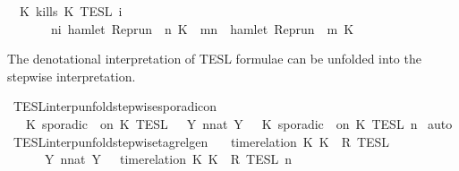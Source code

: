 \begin{isabellebody}
{\isacharbar}\ {\isacartoucheopen}{\isasymlbrakk}\ K\ kills\ K\ {\isasymrbrakk}\isactrlsub T\isactrlsub E\isactrlsub S\isactrlsub L\isactrlbsup {\isasymge}\ i\isactrlesup \ {\isacharequal}\isanewline
\ \ \ \ \ \ {\isacharbraceleft}{\isasymrho}{\isachardot}\ {\isasymforall}n{\isasymge}i{\isachardot}\ hamlet\ {\isacharparenleft}{\isacharparenleft}Rep{\isacharunderscore}run\ {\isasymrho}{\isacharparenright}\ n\ K\ {\isasymlongrightarrow}\ {\isacharparenleft}{\isasymforall}m{\isasymge}n{\isachardot}\ {\isasymnot}\ hamlet\ {\isacharparenleft}{\isacharparenleft}Rep{\isacharunderscore}run\ {\isasymrho}{\isacharparenright}\ m\ K%
\begin{isamarkuptext}%
The denotational interpretation of TESL formulae can be unfolded into the 
  stepwise interpretation.%
\end{isamarkuptext}\isamarkuptrue%
\isamarkupfalse%
\ TESL{\isacharunderscore}interp{\isacharunderscore}unfold{\isacharunderscore}stepwise{\isacharunderscore}sporadicon{\isacharcolon}\isanewline
\ \ {\isacartoucheopen}{\isasymlbrakk}\ K\ sporadic\ {\isasymtau}\ on\ K\ {\isasymrbrakk}\isactrlsub T\isactrlsub E\isactrlsub S\isactrlsub L\ {\isacharequal}\ {\isasymUnion}\ {\isacharbraceleft}Y{\isachardot}\ {\isasymexists}n{\isacharcolon}{\isacharcolon}nat{\isachardot}\ Y\ {\isacharequal}\ {\isasymlbrakk}\ K\ sporadic\ {\isasymtau}\ on\ K\ {\isasymrbrakk}\isactrlsub T\isactrlsub E\isactrlsub S\isactrlsub L\isactrlbsup {\isasymge}\ n\isactrlesup {\isacharbraceright}{\isacartoucheclose}\isanewline
%
\isadelimproof
%
\endisadelimproof
%
\isatagproof
{}\isamarkupfalse%
\ auto%
\endisatagproof
{\isafoldproof}%
%
\isadelimproof
\isanewline
%
\endisadelimproof
\isanewline
{}\isamarkupfalse%
\ TESL{\isacharunderscore}interp{\isacharunderscore}unfold{\isacharunderscore}stepwise{\isacharunderscore}tagrelgen{\isacharcolon}\isanewline
\ \ {\isacartoucheopen}{\isasymlbrakk}\ time{\isacharminus}relation\ {\isasymlfloor}K\ K\ {\isasymin}\ R\ {\isasymrbrakk}\isactrlsub T\isactrlsub E\isactrlsub S\isactrlsub L\isanewline
\ \ \ \ {\isacharequal}\ {\isasymInter}\ {\isacharbraceleft}Y{\isachardot}\ {\isasymexists}n{\isacharcolon}{\isacharcolon}nat{\isachardot}\ Y\ {\isacharequal}\ {\isasymlbrakk}\ time{\isacharminus}relation\ {\isasymlfloor}K\ K\ {\isasymin}\ R\ {\isasymrbrakk}\isactrlsub T\isactrlsub E\isactrlsub S\isactrlsub L\isactrlbsup {\isasymge}\ n\isactrlesup {\isacharbraceright}{\isacartoucheclose}\isanewline

\end{isabellebody}
